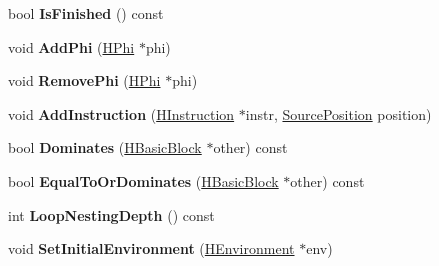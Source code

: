 \begin{DoxyCompactItemize}
\item 
bool {\bfseries Is\+Finished} () const \hypertarget{classv8_1_1internal_1_1_h_basic_block_aeeae4883abf72a4408819d65899c32f3}{}\label{classv8_1_1internal_1_1_h_basic_block_aeeae4883abf72a4408819d65899c32f3}

\item 
void {\bfseries Add\+Phi} (\hyperlink{classv8_1_1internal_1_1_h_phi}{H\+Phi} $\ast$phi)\hypertarget{classv8_1_1internal_1_1_h_basic_block_a0c1b142b6481cf97eb234e8859d8c61f}{}\label{classv8_1_1internal_1_1_h_basic_block_a0c1b142b6481cf97eb234e8859d8c61f}

\item 
void {\bfseries Remove\+Phi} (\hyperlink{classv8_1_1internal_1_1_h_phi}{H\+Phi} $\ast$phi)\hypertarget{classv8_1_1internal_1_1_h_basic_block_a35c160ddc931193071140da73952d186}{}\label{classv8_1_1internal_1_1_h_basic_block_a35c160ddc931193071140da73952d186}

\item 
void {\bfseries Add\+Instruction} (\hyperlink{classv8_1_1internal_1_1_h_instruction}{H\+Instruction} $\ast$instr, \hyperlink{classv8_1_1internal_1_1_source_position}{Source\+Position} position)\hypertarget{classv8_1_1internal_1_1_h_basic_block_a100d4d2e921c5fefb9dd142bd1c2d512}{}\label{classv8_1_1internal_1_1_h_basic_block_a100d4d2e921c5fefb9dd142bd1c2d512}

\item 
bool {\bfseries Dominates} (\hyperlink{classv8_1_1internal_1_1_h_basic_block}{H\+Basic\+Block} $\ast$other) const \hypertarget{classv8_1_1internal_1_1_h_basic_block_a591326a0c2a56d28be12015d020df042}{}\label{classv8_1_1internal_1_1_h_basic_block_a591326a0c2a56d28be12015d020df042}

\item 
bool {\bfseries Equal\+To\+Or\+Dominates} (\hyperlink{classv8_1_1internal_1_1_h_basic_block}{H\+Basic\+Block} $\ast$other) const \hypertarget{classv8_1_1internal_1_1_h_basic_block_aa7da2b854d9e8b156bcd76b5e165ff8c}{}\label{classv8_1_1internal_1_1_h_basic_block_aa7da2b854d9e8b156bcd76b5e165ff8c}

\item 
int {\bfseries Loop\+Nesting\+Depth} () const \hypertarget{classv8_1_1internal_1_1_h_basic_block_adcff644c0e738e904e133abf804fe019}{}\label{classv8_1_1internal_1_1_h_basic_block_adcff644c0e738e904e133abf804fe019}

\item 
void {\bfseries Set\+Initial\+Environment} (\hyperlink{classv8_1_1internal_1_1_h_environment}{H\+Environment} $\ast$env)\hypertarget{classv8_1_1internal_1_1_h_basic_block_a03a91c90728b0498138baab9e9307188}{}\label{classv8_1_1internal_1_1_h_basic_block_a03a91c90728b0498138baab9e9307188}


\end{DoxyCompactItemize}
